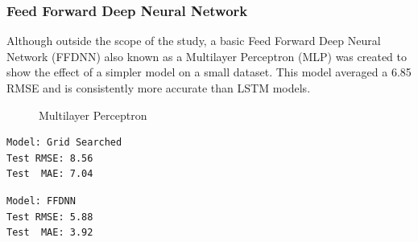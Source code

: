\documentclass[10pt,11pt,12pt,oneside]{book}
\begin{document}
\subsubsection{Feed Forward Deep Neural Network}
Although outside the scope of the study, a basic Feed Forward Deep Neural Network (FFDNN) also known as a Multilayer Perceptron (MLP) was created to show the effect of a simpler model on a small dataset. This model averaged a 6.85 RMSE and is consistently more accurate than LSTM models. \\
\begin{figure}[H]
    \centering
    \qquad
    \caption{Multilayer Perceptron}%
    \label{fig:mlp}%
\end{figure}
\begin{multicols}{2}
\centering
\begin{verbatim}
Model: Grid Searched
Test RMSE: 8.56
Test  MAE: 7.04
\end{verbatim}
\begin{verbatim}
Model: FFDNN
Test RMSE: 5.88
Test  MAE: 3.92
\end{verbatim}
\end{multicols}
\end{document}
